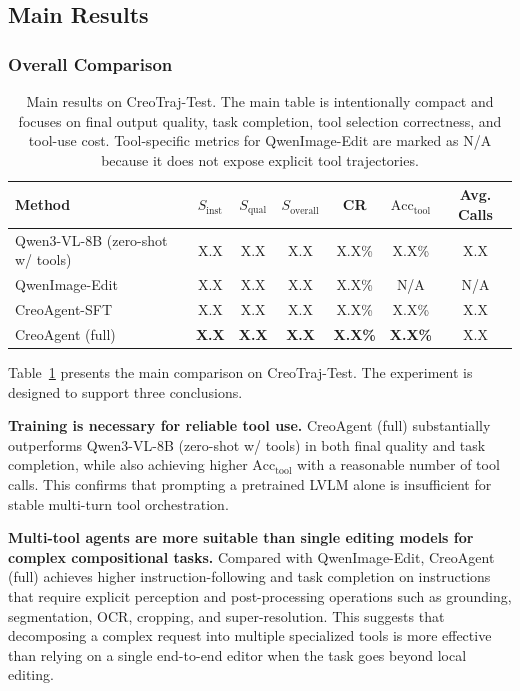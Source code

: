 \documentclass{article}
\begin{document}
\subsection{Main Results}

\subsubsection{Overall Comparison}

\begin{table}[t]
\centering
\caption{Main results on CreoTraj-Test. The main table is intentionally compact and focuses on final output quality, task completion, tool selection correctness, and tool-use cost. Tool-specific metrics for QwenImage-Edit are marked as N/A because it does not expose explicit tool trajectories.}
\label{tab:main}
\begin{tabular}{lcccccc}
\toprule
\textbf{Method} & $S_{\text{inst}}$ & $S_{\text{qual}}$ & $S_{\text{overall}}$ & CR & $\text{Acc}_{\text{tool}}$ & Avg. Calls \\
\midrule
Qwen3-VL-8B (zero-shot w/ tools) & X.X & X.X & X.X & X.X\% & X.X\% & X.X \\
QwenImage-Edit & X.X & X.X & X.X & X.X\% & N/A & N/A \\
CreoAgent-SFT & X.X & X.X & X.X & X.X\% & X.X\% & X.X \\
CreoAgent (full) & \textbf{X.X} & \textbf{X.X} & \textbf{X.X} & \textbf{X.X\%} & \textbf{X.X\%} & X.X \\
\bottomrule
\end{tabular}
\end{table}


Table~\ref{tab:main} presents the main comparison on CreoTraj-Test. The experiment is designed to support three conclusions.

\textbf{Training is necessary for reliable tool use.} CreoAgent (full) substantially outperforms Qwen3-VL-8B (zero-shot w/ tools) in both final quality and task completion, while also achieving higher $\text{Acc}_{\text{tool}}$ with a reasonable number of tool calls. This confirms that prompting a pretrained LVLM alone is insufficient for stable multi-turn tool orchestration.

\textbf{Multi-tool agents are more suitable than single editing models for complex compositional tasks.} Compared with QwenImage-Edit, CreoAgent (full) achieves higher instruction-following and task completion on instructions that require explicit perception and post-processing operations such as grounding, segmentation, OCR, cropping, and super-resolution. This suggests that decomposing a complex request into multiple specialized tools is more effective than relying on a single end-to-end editor when the task goes beyond local editing.
\end{document}

